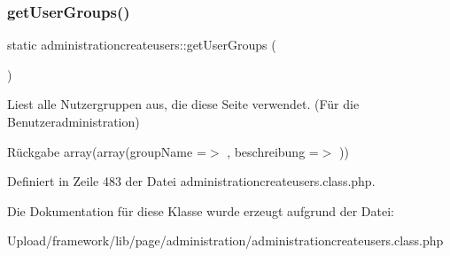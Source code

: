 \mbox{\label{classadministrationcreateusers_a440b583f0374d93e61998e5c7031bf80}} 
\subsubsection{\texorpdfstring{get\+User\+Groups()}{getUserGroups()}}
{\footnotesize\ttfamily static administrationcreateusers\+::get\+User\+Groups (\begin{DoxyParamCaption}{ }\end{DoxyParamCaption})\hspace{0.3cm}{\ttfamily [static]}}

Liest alle Nutzergruppen aus, die diese Seite verwendet. (Für die Benutzeradministration) \begin{DoxyReturn}{Rückgabe}
array(array(\textquotesingle{}group\+Name\textquotesingle{} =$>$ \textquotesingle{}\textquotesingle{}, \textquotesingle{}beschreibung\textquotesingle{} =$>$ \textquotesingle{}\textquotesingle{})) 
\end{DoxyReturn}


Definiert in Zeile 483 der Datei administrationcreateusers.\+class.\+php.



Die Dokumentation für diese Klasse wurde erzeugt aufgrund der Datei\+:\begin{DoxyCompactItemize}
\item 
Upload/framework/lib/page/administration/administrationcreateusers.\+class.\+php\end{DoxyCompactItemize}
